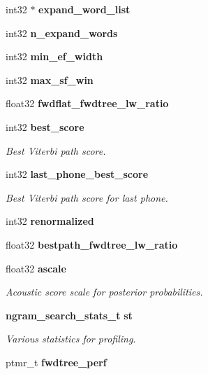 \begin{DoxyCompactItemize}
\item 
int32 $\ast$ {\bfseries expand\-\_\-word\-\_\-list}\label{structngram__search__s_a4fadd755f8823c07dc5ab52f1b6d403d}

\item 
int32 {\bfseries n\-\_\-expand\-\_\-words}\label{structngram__search__s_a8a9999b6557b7c98dc03191a2d117eae}

\item 
int32 {\bfseries min\-\_\-ef\-\_\-width}\label{structngram__search__s_a88877b4dc14e04a6545c89668d8fcffc}

\item 
int32 {\bfseries max\-\_\-sf\-\_\-win}\label{structngram__search__s_a40659238fc506f7a3205eb080837008a}

\item 
float32 {\bfseries fwdflat\-\_\-fwdtree\-\_\-lw\-\_\-ratio}\label{structngram__search__s_a5772dec76068e162cebbae9f0f474aa6}

\item 
int32 {\bf best\-\_\-score}
\begin{DoxyCompactList}\small\item\em Best Viterbi path score. \end{DoxyCompactList}\item 
int32 {\bf last\-\_\-phone\-\_\-best\-\_\-score}
\begin{DoxyCompactList}\small\item\em Best Viterbi path score for last phone. \end{DoxyCompactList}\item 
int32 {\bfseries renormalized}\label{structngram__search__s_abf5988b55e39ff07d65edf61086a69da}

\item 
float32 {\bfseries bestpath\-\_\-fwdtree\-\_\-lw\-\_\-ratio}\label{structngram__search__s_a99114235f6ae8bc6d7c5849465499633}

\item 
float32 {\bf ascale}
\begin{DoxyCompactList}\small\item\em Acoustic score scale for posterior probabilities. \end{DoxyCompactList}\item 
{\bf ngram\-\_\-search\-\_\-stats\-\_\-t} {\bf st}
\begin{DoxyCompactList}\small\item\em Various statistics for profiling. \end{DoxyCompactList}\item 
ptmr\-\_\-t {\bfseries fwdtree\-\_\-perf}\label{structngram__search__s_af51ec91c4ea052252542a4ec395484d7}


\end{DoxyCompactItemize}
